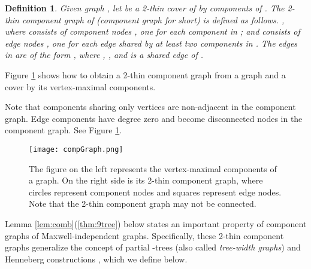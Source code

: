 \documentclass[10pt]{article}
\newtheorem{dfn}{Definition}
\begin{document}
\begin{dfn}\label{dfn:componentGraph}
Given graph , let     be a 2-thin cover of  by components of . The {\em 2-thin component graph}  of  ({\em component graph} for short) is defined as follows.     , where  consists of {\em component nodes} , one for each component  in ; and  consists of {\em edge nodes} , one for each edge  shared by at least two components in . The edges in  are of the form , where   ,   , and  is a shared edge of .
\end{dfn}
\noindent
Figure \ref{compG} shows how to obtain a 2-thin component graph from a graph and a cover by its vertex-maximal components.

\medskip
\noindent
Note that components sharing only vertices are non-adjacent in the component graph. Edge components have degree zero and become disconnected nodes in the component graph. See Figure \ref{compG}.

\begin{center}
\begin{figure}[!h]
\begin{center}
\texttt{[image: compGraph.png]}
\end{center}
\caption{The figure on the left represents the vertex-maximal components of a graph. On the right side is its 2-thin component graph, where circles represent component nodes and squares represent edge nodes. Note that the 2-thin component graph may not be connected.}\label{compG}
\end{figure}
\end{center}

\begin{comment}
\begin{center}
\begin{figure}[h]
\begin{center}
\psfrag{Con}{Two components share an edge}\psfrag{Dis}{Two components do not share an edge}
\scalebox{0.5}[0.5]{\texttt{[image: compGraph]}}
\end{center}
\caption{The figure on the left represents the vertex-maximal components of a graph. On the right side is its 2-thin component graph, where circles represent component nodes and squares represent edge nodes. Note that the 2-thin component graph may not be connected.}\label{compG}
\end{figure}
\end{center}
\end{comment}

\noindent
Lemma \ref{lem:comb}(\ref{thm:9tree}) below states an important property of component graphs of Maxwell-independent graphs. Specifically,  these 2-thin component graphs generalize the concept of partial -trees (also called {\em tree-width  graphs}) and Henneberg constructions \cite{graver:servatius:rigidityBook:1993}, which we define below.
\end{document}
